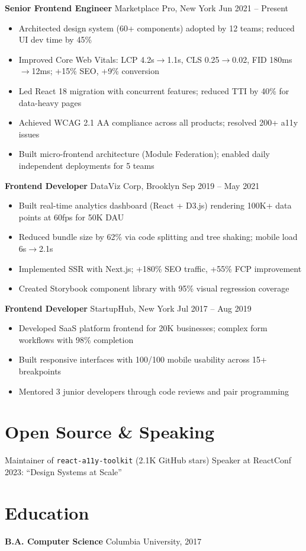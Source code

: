 \documentclass[10pt,a4paper]{article}
\begin{document}
\textbf{Senior Frontend Engineer} \quad{\color{secondary}\textbar}\quad Marketplace Pro, New York \hfill Jun 2021 -- Present
\begin{itemize}
  \item Architected design system (60+ components) adopted by 12 teams; reduced UI dev time by 45\%
  \item Improved Core Web Vitals: LCP 4.2s$\rightarrow$1.1s, CLS 0.25$\rightarrow$0.02, FID 180ms$\rightarrow$12ms; +15\% SEO, +9\% conversion
  \item Led React 18 migration with concurrent features; reduced TTI by 40\% for data-heavy pages
  \item Achieved WCAG 2.1 AA compliance across all products; resolved 200+ a11y issues
  \item Built micro-frontend architecture (Module Federation); enabled daily independent deployments for 5 teams
\end{itemize}

\textbf{Frontend Developer} \quad{\color{secondary}\textbar}\quad DataViz Corp, Brooklyn \hfill Sep 2019 -- May 2021
\begin{itemize}
  \item Built real-time analytics dashboard (React + D3.js) rendering 100K+ data points at 60fps for 50K DAU
  \item Reduced bundle size by 62\% via code splitting and tree shaking; mobile load 6s$\rightarrow$2.1s
  \item Implemented SSR with Next.js; +180\% SEO traffic, +55\% FCP improvement
  \item Created Storybook component library with 95\% visual regression coverage
\end{itemize}

\textbf{Frontend Developer} \quad{\color{secondary}\textbar}\quad StartupHub, New York \hfill Jul 2017 -- Aug 2019
\begin{itemize}
  \item Developed SaaS platform frontend for 20K businesses; complex form workflows with 98\% completion
  \item Built responsive interfaces with 100/100 mobile usability across 15+ breakpoints
  \item Mentored 3 junior developers through code reviews and pair programming
\end{itemize}

\section{Open Source \& Speaking}
Maintainer of \texttt{\color{primary}react-a11y-toolkit} (2.1K GitHub stars) \quad\textbar\quad Speaker at ReactConf 2023: ``Design Systems at Scale''

\section{Education}
\textbf{B.A. Computer Science} \hfill Columbia University, 2017
\end{document}
